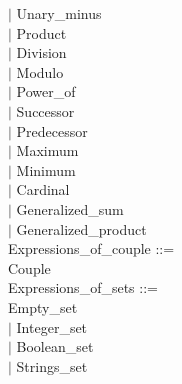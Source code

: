 \documentclass[12pt,a4paper,draft]{article}
\begin{document}
{\begin{sloppypar}
{\hspace*{0.20in} $|$  Unary\_minus\\
\hspace*{0.20in} $|$  Product\\
\hspace*{0.20in} $|$  Division\\
\hspace*{0.20in} $|$  Modulo\\
\hspace*{0.20in} $|$  Power\_of\\
\hspace*{0.20in} $|$  Successor\\
\hspace*{0.20in} $|$  Predecessor}\\
\hspace*{0.20in} $|$  Maximum\\
\hspace*{0.20in} $|$  Minimum\\
\hspace*{0.20in} $|$  Cardinal\\
\hspace*{0.20in} $|$  Generalized\_sum\\
\hspace*{0.20in} $|$  Generalized\_product\\
Expressions\_of\_couple ::= \\
\hspace*{0.20in}   Couple\\
Expressions\_of\_sets ::= \\
\hspace*{0.20in}   Empty\_set\\
\hspace*{0.20in} $|$  Integer\_set\\
\hspace*{0.20in} $|$  Boolean\_set\\
\hspace*{0.20in} $|$  Strings\_set\\



\end{sloppypar}}
\end{document}
